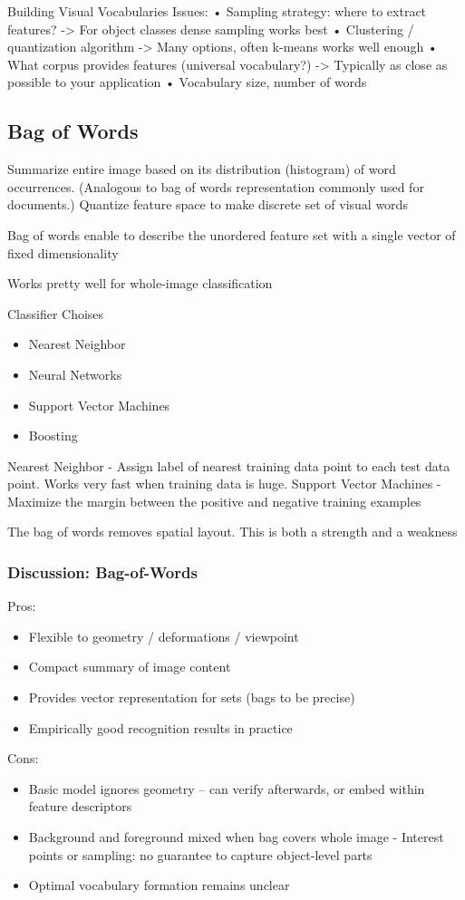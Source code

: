Building Visual Vocabularies
Issues: • Sampling strategy: where to extract features? ->
For object classes dense sampling works best
• Clustering / quantization algorithm ->
Many options, often k-means works well enough
• What corpus provides features (universal vocabulary?) ->
Typically as close as possible to your application • Vocabulary size, number of words\\

\subsection{Bag of Words}
Summarize entire image based on its distribution (histogram) of word occurrences.
(Analogous to bag of words representation commonly used for documents.) Quantize feature space to make discrete set of visual words

Bag of words enable to describe the unordered feature set with a single vector of fixed dimensionality

Works pretty well for whole-image classification

Classifier Choises

\begin{itemize}
	\item Nearest Neighbor
	\item Neural Networks
	\item Support Vector Machines
	\item Boosting
\end{itemize}

Nearest Neighbor - Assign label of nearest training data point to each test data point. Works very fast when training data is huge.
Support Vector Machines - Maximize the margin between the positive and negative training examples

The bag of words removes spatial layout. This is both a strength and a weakness

\subsubsection{Discussion: Bag-of-Words}
Pros:
\begin{itemize}
	\item Flexible to geometry / deformations / viewpoint
	\item Compact summary of image content
	\item Provides vector representation for sets (bags to be precise)
	\item Empirically good recognition results in practice
\end{itemize}
Cons:
\begin{itemize}
	\item Basic model ignores geometry – can verify afterwards, or embed within feature descriptors
	\item Background and foreground mixed when bag covers whole image - Interest points or sampling: no guarantee to capture object-level parts
	\item Optimal vocabulary formation remains unclear

\end{itemize}

